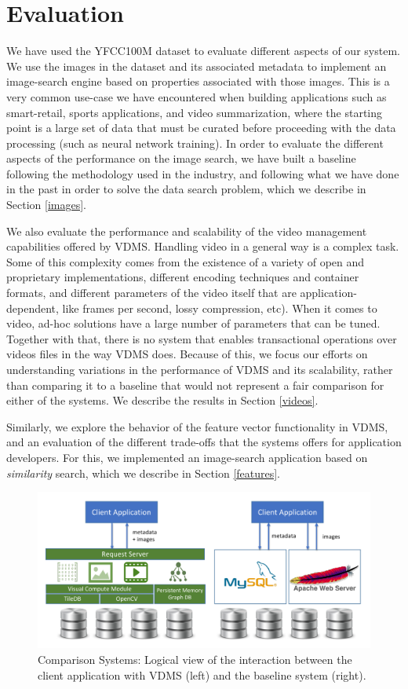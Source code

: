 \section{Evaluation}
\label{eval}

We have used the YFCC100M dataset to evaluate different aspects of our system.
We use the images in the dataset and its associated metadata to implement
an image-search engine based on properties associated with those images.
This is a very common use-case we have encountered when building
applications such as smart-retail, sports applications, and video summarization,
where the starting point is a large set of data that must be curated
before proceeding with the data processing (such as neural network training).
In order to evaluate the different aspects of the performance on the
image search, we have built a baseline following the methodology
used in the industry, and following what we have done in the past
in order to solve the data search problem,
which we describe in Section \ref{images}.

We also evaluate the performance and scalability of the video management
capabilities offered by VDMS.
Handling video in a general way is a complex task.
Some of this complexity comes from the existence of a variety of open and
proprietary implementations, different encoding techniques and container
formats, and different parameters of the video itself that are
application-dependent, like frames per second, lossy compression, etc).
When it comes to video, ad-hoc solutions have a large number of parameters that
can be tuned.
Together with that, there is no system that enables transactional
operations over videos files in the way VDMS does.
Because of this, we focus our efforts on understanding variations in the
performance of VDMS and its scalability, rather than comparing
it to a baseline that would not represent a fair
comparison for either of the systems.
We describe the results in Section \ref{videos}.

Similarly, we explore the behavior of the feature vector functionality in VDMS,
and an evaluation of the different trade-offs that the systems offers for
application developers. For this, we implemented an image-search application
based on \textit{similarity} search, which we describe in Section \ref{features}.


\begin{figure}
\centering
\includegraphics[width=\textwidth]{figures/comparison_system}
\caption{Comparison Systems: Logical view of the interaction between the client application with VDMS (left) and the baseline system (right).}
\label{fig:systems}
\end{figure}

